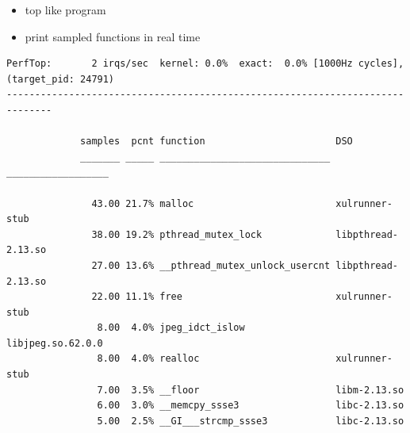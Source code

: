 \begin{frame}[fragile]{}
\begin{itemize}
  \item top like program
  \item print sampled functions in real time
\end{itemize}
\pause
\begin{lstlisting}[basicstyle=\tiny\ttfamily]
   PerfTop:       2 irqs/sec  kernel: 0.0%  exact:  0.0% [1000Hz cycles],  (target_pid: 24791)
------------------------------------------------------------------------------

             samples  pcnt function                       DSO
             _______ _____ ______________________________ __________________

               43.00 21.7% malloc                         xulrunner-stub    
               38.00 19.2% pthread_mutex_lock             libpthread-2.13.so
               27.00 13.6% __pthread_mutex_unlock_usercnt libpthread-2.13.so
               22.00 11.1% free                           xulrunner-stub    
                8.00  4.0% jpeg_idct_islow                libjpeg.so.62.0.0 
                8.00  4.0% realloc                        xulrunner-stub    
                7.00  3.5% __floor                        libm-2.13.so      
                6.00  3.0% __memcpy_ssse3                 libc-2.13.so      
                5.00  2.5% __GI___strcmp_ssse3            libc-2.13.so      
\end{lstlisting}
\end{frame}



